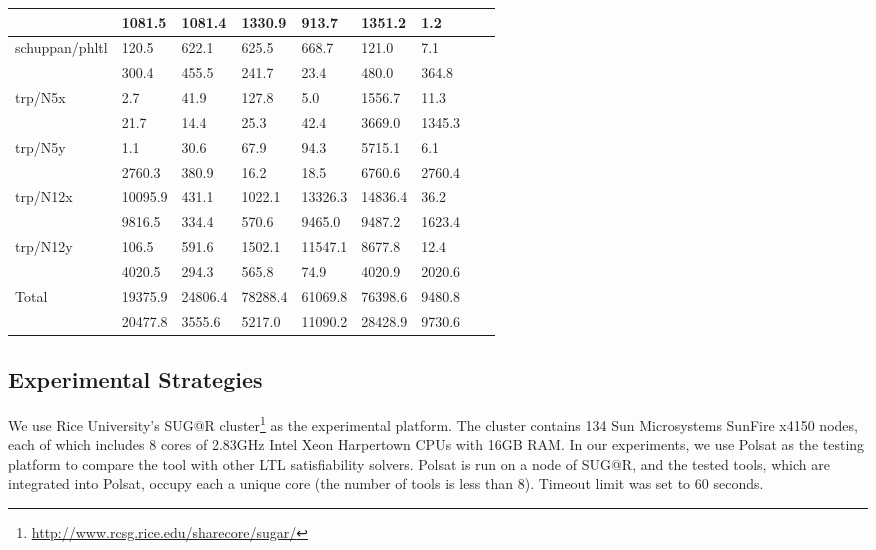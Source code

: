 \documentclass[conference]{IEEEtran}
\begin{document}
\begin{table*}
{\begin{tabular}{|l|l|l|l|l|l|l|l|l|}
  & 1081.5 & 1081.4 & 1330.9 & 913.7 & 1351.2 & \cellcolor{green!35} 1.2\\
\hline

\multirow{2}{*}{schuppan/phltl}  &  120.5  &  622.1  &  625.5  &  668.7  &  121.0  & \cellcolor{blue!35} 7.1 \\
 & 300.4  &  455.5  &  241.7  & \cellcolor{green!35} 23.4  &  480.0  &  364.8\\
\hline

\multirow{2}{*}{trp/N5x}  & \cellcolor{blue!35} 2.7  &  41.9  &  127.8  &  5.0  &  1556.7  &  11.3\\

  & 21.7 & \cellcolor{green!35}14.4 & 25.3 &  42.4 & 3669.0 & 1345.3\\
\hline
\multirow{2}{*}{trp/N5y}  & \cellcolor{blue!35} 1.1  &  30.6  &  67.9  &  94.3  &  5715.1  &  6.1\\

  & 2760.3 &   380.9 & \cellcolor{green!35} 16.2 &  18.5 & 6760.6 & 2760.4\\
\hline
\multirow{2}{*}{trp/N12x}  &  10095.9  &  431.1  &  1022.1  &  13326.3  &  14836.4  & \cellcolor{blue!35} 36.2\\

  & 9816.5 & \cellcolor{green!35}334.4 & 570.6 & 9465.0 & 9487.2 &  1623.4\\
\hline
trp/N12y  &  106.5  &  591.6  &  1502.1  &  11547.1  &  8677.8  & \cellcolor{blue!35} 12.4\\

  & 4020.5  &  294.3  &  565.8  & \cellcolor{green!35} 74.9  &  4020.9  &  2020.6\\

\hline
\multirow{2}{*}{Total}  &  19375.9  &  24806.4  &  78288.4  &  61069.8  &  76398.6  & \cellcolor{red!35} 9480.8\\

& 20477.8 &  3555.6 & 5217.0 & 11090.2 & 28428.9 & \cellcolor{red!35} 9730.6\\
\hline

\end{tabular}
}

\end{table*}

\subsection{Experimental Strategies}

We use Rice University's SUG@R cluster\footnote{\url{http://www.rcsg.rice.edu/sharecore/sugar/}} 
as the experimental platform. The cluster contains 134 Sun Microsystems 
SunFire x4150 nodes, each of which includes 8 cores of 2.83GHz Intel Xeon 
Harpertown CPUs with 16GB RAM. In our experiments, we use Polsat as the 
testing platform \cite{LPZVHCoRR13} to compare the tool with other LTL 
satisfiability solvers. Polsat is run on a node of SUG@R, and the tested 
tools, which are integrated into Polsat, occupy each a unique core (the 
number of tools is less than 8). Timeout limit was set to 60 seconds. 
\end{document}
